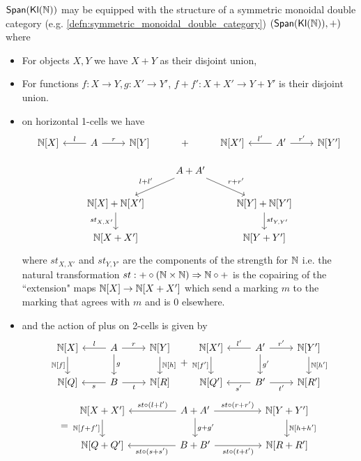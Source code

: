 \begin{prop}
$\mathsf{Span}(\mathsf{\mathsf{Kl}(\mathbb{N}) })$ may be equipped with the structure of a symmetric monoidal double category (e.g. \ref{defn:symmetric_monoidal_double_category}) $(
\mathsf{Span}(\mathsf{\mathsf{Kl}(\mathbb{N}) }),+)$ where
\begin{itemize}
    \item For objects $X,Y$ we have $X + Y$ as their disjoint union,
    \item For functions $f: X \to Y, g: X' \to Y'$, $f + f' : X +  X' \to Y + Y'$ is their disjoint union.
    \item on horizontal 1-cells we have
    \[\begin{tikzcd}
    \N[X] &\ar[l,"l",swap]  A \ar[r,"r"] &\N[Y] & + & \N[X'] &\ar[l,"l'",swap]  A' \ar[r,"r'"] &\N[Y']
\end{tikzcd}\]

\[ \begin{tikzcd}
	& {A + A'} \\
	{\N[X] + \N[X']} && {\N[Y] + \N[Y']} \\
	{\N[X + X']} && {\N[Y+Y']}
	\arrow["{l+l'}"', from=1-2, to=2-1]
	\arrow["{r+r'}", from=1-2, to=2-3]
	\arrow["{st_{X,X'}}"', from=2-1, to=3-1]
	\arrow["{st_{Y,Y'}}", from=2-3, to=3-3]
\end{tikzcd}\]
 where $st_{X,X'}$ and $st_{Y,Y'}$ are the components of the strength for $\mathbb{N}$ i.e. the natural transformation $st :  + \circ (\mathbb{N} \times \mathbb{N}) \Rightarrow \mathbb{N} \circ +$ is the copairing of the ``extension" maps $\mathbb{N}[X] \to \mathbb{N}[X + X']$ which send a marking $m$ to the marking that agrees with $m$ and is $0$ elsewhere.
 \item and the action of plus on 2-cells is given by
 \[\begin{tikzcd}
	\N[X] & A & \N[Y] \\
	\N[Q] & B & \N[R]
	\arrow["{\N[f]}"', from=1-1, to=2-1]
	\arrow["l"', from=1-2, to=1-1]
	\arrow["r", from=1-2, to=1-3]
	\arrow["{s}", from=2-2, to=2-1]
	\arrow["{t}"', from=2-2, to=2-3]
	\arrow["{\N[h]}", from=1-3, to=2-3]
	\arrow["g", from=1-2, to=2-2]
\end{tikzcd} + \begin{tikzcd}
	{\N[X']} & {A'} & {\N[Y']} \\
	{\N[Q']} & {B'} & {\N[R']}
	\arrow["{\N[f']}"', from=1-1, to=2-1]
	\arrow["{l'}"', from=1-2, to=1-1]
	\arrow["{r'}", from=1-2, to=1-3]
	\arrow["{s'}", from=2-2, to=2-1]
	\arrow["{t'}"', from=2-2, to=2-3]
	\arrow["{\N[h']}", from=1-3, to=2-3]
	\arrow["{g'}", from=1-2, to=2-2]
\end{tikzcd}\] 
\[=\begin{tikzcd}
	{\N[X+ X']} && {A+A'} && {\N[Y+Y']} \\
	{\N[Q+Q']} && {B+B'} && {\N[R+R']}
	\arrow["{st \circ (l + l')}"', from=1-3, to=1-1]
	\arrow["{st \circ (r + r')}", from=1-3, to=1-5]
	\arrow["{st \circ (s + s')}", from=2-3, to=2-1]
	\arrow["{st \circ (t + t')}"', from=2-3, to=2-5]
	\arrow["{g+g'}", from=1-3, to=2-3]
	\arrow["{\N[h+h']}", from=1-5, to=2-5]
	\arrow["{\N[f+f']}"', from=1-1, to=2-1]
\end{tikzcd}\]
\end{itemize}
\end{prop}
